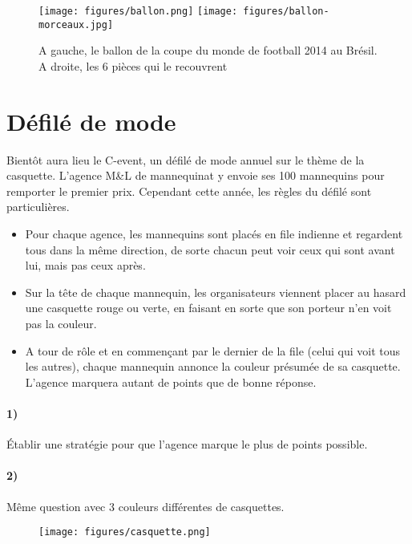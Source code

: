 \documentclass[a4paper,10pt,oneside]{article}
\begin{document}
\vspace{3cm}
\begin{figure}[!ht]
  \centering
  \texttt{[image: figures/ballon.png]}
  \hspace{1cm}
  \texttt{[image: figures/ballon-morceaux.jpg]}
  \caption*{A gauche, le ballon de la coupe du monde de football 2014 au Brésil.
  A droite, les 6 pièces qui le recouvrent}
\end{figure}



\clearpage
\section{Défilé de mode}

Bientôt aura lieu le C-event, un défilé de mode annuel sur le thème de la casquette.
L'agence M\&L de mannequinat y envoie ses 100 mannequins pour remporter le premier prix.
Cependant cette année, les règles du défilé sont particulières.
\begin{itemize}
  \item Pour chaque agence, les mannequins sont placés en file indienne et regardent tous dans la même direction, de sorte chacun peut voir ceux qui sont avant lui, mais pas ceux après.
  \item Sur la tête de chaque mannequin, les organisateurs viennent placer au hasard une casquette rouge ou verte, en faisant en sorte que son porteur n'en voit pas la couleur.
  \item A tour de rôle et en commençant par le dernier de la file (celui qui voit tous les autres), chaque mannequin annonce la couleur présumée de sa casquette. L'agence marquera autant de points que de bonne réponse.
\end{itemize}

\paragraph*{1)}
Établir une stratégie pour que l'agence marque le plus de points possible.

\paragraph*{2)}
Même question avec $3$ couleurs différentes de casquettes.


\vspace{3cm}
\begin{figure}[!ht]
  \centering
  \texttt{[image: figures/casquette.png]}
  \caption*{}
\end{figure}
\end{document}
